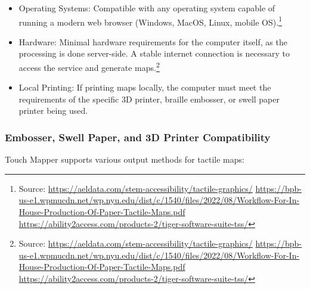 \begin{itemize}
    \item Operating Systems: Compatible with any operating system capable of running a modern web browser (Windows, MacOS, Linux, mobile OS).\footnote{Source:  \url{https://aeldata.com/stem-accessibility/tactile-graphics/} \url{https://bpb-us-e1.wpmucdn.net/wp.nyu.edu/dist/c/1540/files/2022/08/Workflow-For-In-House-Production-Of-Paper-Tactile-Maps.pdf} \url{https://ability2access.com/products-2/tiger-software-suite-tss/}}
    \item Hardware: Minimal hardware requirements for the computer itself, as the processing is done server-side. A stable internet connection is necessary to access the service and generate maps.\footnote{Source:  \url{https://aeldata.com/stem-accessibility/tactile-graphics/} \url{https://bpb-us-e1.wpmucdn.net/wp.nyu.edu/dist/c/1540/files/2022/08/Workflow-For-In-House-Production-Of-Paper-Tactile-Maps.pdf} \url{https://ability2access.com/products-2/tiger-software-suite-tss/}}
    \item Local Printing: If printing maps locally, the computer must meet the requirements of the specific 3D printer, braille embosser, or swell paper printer being used.
\end{itemize}

\subsubsection{Embosser, Swell Paper, and 3D Printer Compatibility}

Touch Mapper supports various output methods for tactile maps:

